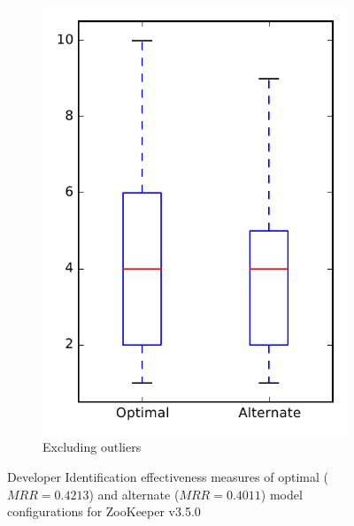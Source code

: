 \begin{figure}
\begin{subfigure}{.4\textwidth}
        \includegraphics[height=0.4\textheight]{figures/combo/dit_rq1_zookeeper_no_outlier}
        \caption{Excluding outliers}\label{fig:combo:dit:rq1:zookeeper_no_outlier}
    \end{subfigure}
\caption[Developer Identification effectiveness measures of optimal and alternate model configurations for ZooKeeper v3.5.0]%
{Developer Identification effectiveness measures of optimal ($MRR=0.4213$) and alternate ($MRR=0.4011$) model configurations for ZooKeeper v3.5.0}
\label{fig:combo:dit:rq1:zookeeper}
\end{figure}
